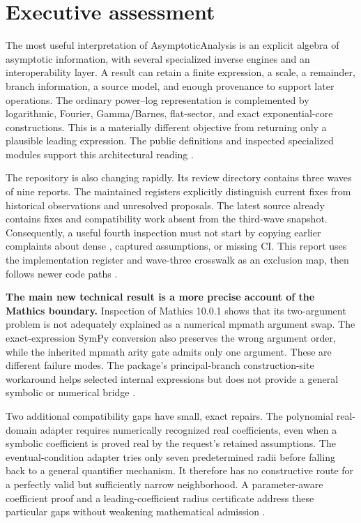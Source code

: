 \documentclass[11pt,a4paper]{article}
\newcommand{\code}[1]{\texttt{\detokenize{#1}}}
\theoremstyle{remark}
\begin{document}
\tableofcontents
\clearpage

\section{Executive assessment}

The most useful interpretation of AsymptoticAnalysis is an explicit algebra of asymptotic information, with several specialized inverse engines and an interoperability layer. A result can retain a finite expression, a scale, a remainder, branch information, a source model, and enough provenance to support later operations. The ordinary power--log representation is complemented by logarithmic, Fourier, Gamma/Barnes, flat-sector, and exact exponential-core constructions. This is a materially different objective from returning only a plausible leading expression. The public definitions and inspected specialized modules support this architectural reading \cite{core,fourier,gammainverse,expcore}.

The repository is also changing rapidly. Its review directory contains three waves of nine reports. The maintained registers explicitly distinguish current fixes from historical observations and unresolved proposals. The latest source already contains fixes and compatibility work absent from the third-wave snapshot. Consequently, a useful fourth inspection must not start by copying earlier complaints about dense \code{SeriesData}, captured assumptions, or missing CI. This report uses the implementation register and wave-three crosswalk as an exclusion map, then follows newer code paths \cite{reviewindex,status,intake}.

\textbf{The main new technical result is a more precise account of the Mathics boundary.} Inspection of Mathics 10.0.1 shows that its two-argument \code{ProductLog} problem is not adequately explained as a numerical mpmath argument swap. The exact-expression SymPy conversion also preserves the wrong argument order, while the inherited mpmath arity gate admits only one argument. These are different failure modes. The package's principal-branch construction-site workaround helps selected internal expressions but does not provide a general symbolic or numerical bridge \cite{mathicscorefunctions,upstreamexp,upstreambuiltin}.

Two additional compatibility gaps have small, exact repairs. The polynomial real-domain adapter requires numerically recognized real coefficients, even when a symbolic coefficient is proved real by the request's retained assumptions. The eventual-condition adapter tries only seven predetermined radii before falling back to a general quantifier mechanism. It therefore has no constructive route for a perfectly valid but sufficiently narrow neighborhood. A parameter-aware coefficient proof and a leading-coefficient radius certificate address these particular gaps without weakening mathematical admission \cite{mathicsbranches,inversebranches,inverseexpressions}.
\end{document}
